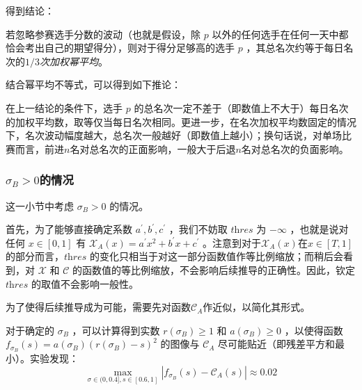             得到结论：

            \begin{tcolorbox}[colback=white,colframe=black,boxrule=0.5pt,arc=0pt]
                若忽略参赛选手分数的波动（也就是假设，除 $p$ 以外的任何选手在任何一天中都恰会考出自己的期望得分），则对于得分足够高的选手 $p$ ，其总名次约等于每日名次的\emph{$1/3$次加权幂平均}。
            \end{tcolorbox}

            结合幂平均不等式\cite{wiki_powerMean}，可以得到如下推论：
            
            \begin{tcolorbox}[colback=white,colframe=black,boxrule=0.5pt,arc=0pt]
                在上一结论的条件下，选手 $p$ 的总名次一定不差于（即数值上不大于）每日名次的加权平均数，取等仅当每日名次相同。更进一步，在名次加权平均数固定的情况下，名次波动幅度越大，总名次一般越好（即数值上越小）；换句话说，对单场比赛而言，前进$n$名对总名次的正面影响，一般大于后退$n$名对总名次的负面影响。
            \end{tcolorbox}

        \subsubsection{$\sigma_B>0$的情况}

            这一小节中考虑 $\sigma_B>0$ 的情况。

            \vspace{1.5ex}
            
            首先，为了能够直接确定系数 $a^\prime,b^\prime,c^\prime$ ，我们不妨取 $\textit{thres}$ 为 $-\infty$ ，也就是说对任何 $x\in [0,1]$ 有 $\mathcal{X}_A(x)=a^\prime x^2+b^\prime x+c^\prime$ 。注意到对于$\mathcal{X}_A(x)$在$x\in [T,1]$的部分而言，$\textit{thres}$ 的变化只相当于对这一部分函数值作等比例缩放；而稍后会看到，对 $\mathcal{X}$ 和 $\mathcal{C}$ 的函数值的等比例缩放，不会影响后续推导的正确性。因此，钦定 $\textit{thres}$ 的取值不会影响一般性。

            \vspace{1.5ex}

            为了使得后续推导成为可能，需要先对函数$\mathcal{C}_A$作近似，以简化其形式。

            对于确定的 $\sigma_B$ ，可以计算得到实数 $r(\sigma_B)\geq 1$ 和 $a(\sigma_B)\geq 0$ ，以使得函数 $f_{\sigma_B}(s)=a(\sigma_B)(r(\sigma_B)-s)^2$ 的图像与 $\mathcal{C}_A$ 尽可能贴近（即残差平方和最小）。实验发现：
            $$
            \max\limits_{\sigma\in (0,0.4],s\in [0.6,1]} \left|f_{\sigma_B}(s)-\mathcal{C}_A(s)\right|\approx 0.02
            $$

